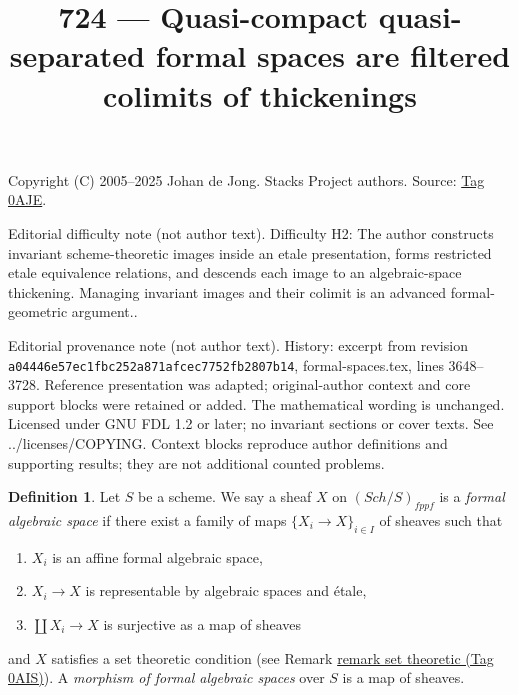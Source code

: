 \documentclass{amsart}
\theoremstyle{plain}
\theoremstyle{definition}
\newtheorem{definition}[subsection]{Definition}
\theoremstyle{remark}
\numberwithin{equation}{subsection}
\def\Sch{\mathit{Sch}}
\begin{document}
\title[Stacks Project, Tag 0AJE]{724 --- Quasi-compact quasi-separated formal spaces are filtered colimits of thickenings}
\maketitle
\noindent Copyright (C) 2005--2025 Johan de Jong. Stacks Project authors. Source: \href{https://stacks.math.columbia.edu/tag/0AJE}{Tag 0AJE}.

\noindent Editorial difficulty note (not author text). Difficulty H2: The author constructs invariant scheme-theoretic images inside an etale presentation, forms restricted etale equivalence relations, and descends each image to an algebraic-space thickening. Managing invariant images and their colimit is an advanced formal-geometric argument..

\noindent Editorial provenance note (not author text). History: excerpt from revision \texttt{a0444\allowbreak 6e57e\allowbreak c1fbc\allowbreak 252a8\allowbreak 71afc\allowbreak ec775\allowbreak 2fb28\allowbreak 07b14}, formal-spaces.tex, lines 3648--3728. Reference presentation was adapted; original-author context and core support blocks were retained or added. The mathematical wording is unchanged. Licensed under GNU FDL 1.2 or later; no invariant sections or cover texts. See ../licenses/COPYING. Context blocks reproduce author definitions and supporting results; they are not additional counted problems.

\begin{definition}
\label{definition-formal-algebraic-space}
Let $S$ be a scheme. We say a sheaf $X$ on $(\Sch/S)_{fppf}$ is a
{\it formal algebraic space} if there exist a family of maps
$\{X_i \to X\}_{i \in I}$ of sheaves such that
\begin{enumerate}
\item $X_i$ is an affine formal algebraic space,
\item $X_i \to X$ is representable by algebraic spaces and \'etale,
\item $\coprod X_i \to X$ is surjective as a map of sheaves
\end{enumerate}
and $X$ satisfies a set theoretic condition
(see Remark \href{https://stacks.math.columbia.edu/tag/0AIS}{remark set theoretic (Tag 0AIS)}). A
{\it morphism of formal algebraic spaces}
over $S$ is a map of sheaves.
\end{definition}
\end{document}
